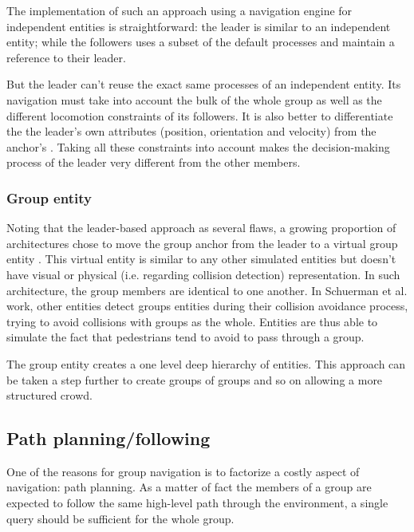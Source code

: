 \documentclass[a4paper,titlepage]{article}
\begin{document}
The implementation of such an approach using a navigation engine for independent entities is straightforward: the leader is similar to an independent entity; while the followers uses a subset of the default processes and maintain a reference to their leader.

But the leader can’t reuse the exact same processes of an independent entity. Its navigation must take into account the bulk of the whole group as well as the different locomotion constraints of its followers. It is also better to differentiate the the leader’s own attributes (position, orientation and velocity) from the anchor’s \cite{Millington:2006wz}. Taking all these constraints into account makes the decision-making process of the leader very different from the other members.

\subsubsection{Group entity}

Noting that the leader-based approach as several flaws, a growing proportion of architectures chose to move the group anchor from the leader to a virtual group entity \cite{Schuerman:2010um,Silveira:2008bc,Karamouzas:2010fi}. This virtual entity is similar to any other simulated entities but doesn’t have visual or physical (i.e. regarding collision detection) representation. In such architecture, the group members are identical to one another. 
In Schuerman et al. \cite{Schuerman:2010um} work, other entities detect groups entities during their collision avoidance process, trying to avoid collisions with groups as the whole. Entities are thus able to simulate the fact that pedestrians tend to avoid to pass through a group.

The group entity creates a one level deep hierarchy of entities. This approach can be taken a step further to create groups of groups and so on \cite{Schuerman:2010um,Millington:2006wz} allowing a more structured crowd.

\subsection{Path planning/following}
\label{sec:who_s_in_charge:path_planning_following}

One of the reasons for group navigation is to factorize a costly aspect of navigation: path planning. As a matter of fact the members of a group are expected to follow the same high-level path through the environment, a single query should be sufficient for the whole group.
\end{document}

